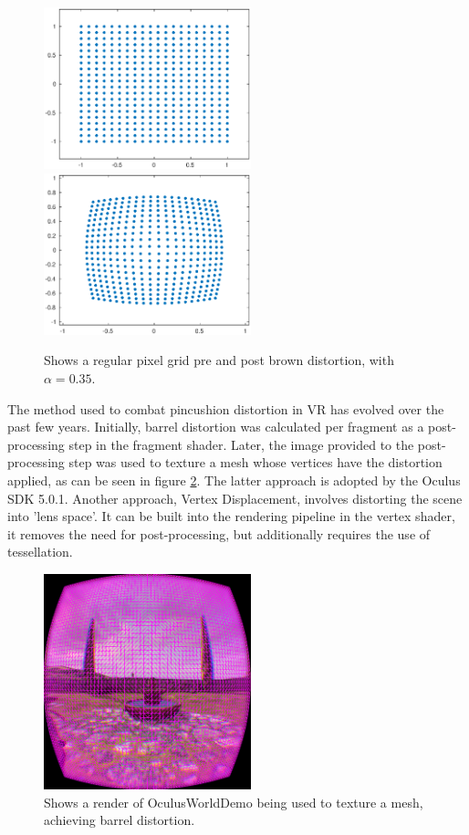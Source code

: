 \documentclass[12pt,a4paper,twoside,openright]{report}
\begin{document}
\begin{figure}[tbh]
\begin{center}
\includegraphics[width=6cm]{figs/pre_distortion.eps}
\includegraphics[width=6cm]{figs/post_distortion.eps}
\caption{Shows a regular pixel grid pre and post brown distortion, with $\alpha = 0.35 $.}
\label{epsfig1}
\end{center}
\end{figure}

The method used to combat pincushion distortion in VR has evolved over the past few years. Initially, barrel distortion was calculated per fragment as a post-processing step in the fragment shader. Later, the image provided to the post-processing step was used to texture a mesh whose vertices have the distortion applied, as can be seen in figure \ref {fig:meshgrid}. The latter approach is adopted by the Oculus SDK 5.0.1. Another approach, Vertex Displacement, involves distorting the scene into 'lens space'. It can be built into the rendering pipeline in the vertex shader, it removes the need for post-processing, but additionally requires the use of tessellation. \cite{vertexDisplacement}

\begin{figure}[tbh]
\begin{center}
\includegraphics[width=6cm]{figs/barrelgrid.png}
\caption{Shows a render of OculusWorldDemo being used to texture a mesh, achieving barrel distortion.}
\label{fig:meshgrid}
\end{center}
\end{figure}
\end{document}
